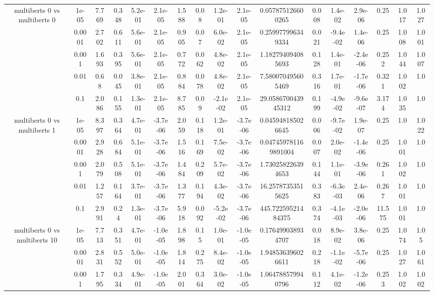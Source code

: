 \begin{tabular}{|c|c|c|c|c|c|c|c|c|c|c|c|c|c|c|c|c|}
\hline
\multirow{5}{*}{multiberts 0 vs multiberts 0} & 1e-05 & 7.769 & 0.348 & 5.2e-01 & 2.1e-05 & 1.588 & 0.08 & 1.2e-01 & 2.1e-05 & 0.057875126600265 & 0.008 & 1.4e-02 & 2.9e-06 & 0.25 & 1.017 & 1.027 \\
 & 0.0001 & 2.702 & 0.611 & 5.6e-01 & 2.1e-05 & 0.905 & 0.07 & 6.0e-02 & 2.1e-05 & 0.259977996349334 & 0.021 & -9.4e-02 & 1.4e-06 & 0.25 & 1.008 & 1.001 \\
 & 0.001 & 1.693 & 0.395 & 5.6e-01 & 2.1e-05 & 0.772 & 0.062 & 4.8e-02 & 2.1e-05 & 1.182794094085693 & 0.128 & 1.4e-01 & -2.4e-06 & 0.252 & 1.044 & 1.007 \\
 & 0.01 & 0.68 & 0.045 & 3.8e-01 & 2.1e-05 & 0.884 & 0.078 & 4.8e-02 & 2.1e-05 & 7.580070495605469 & 0.316 & 1.7e-01 & -1.7e-06 & 0.321 & 1.002 & 1.0 \\
 & 0.1 & 2.086 & 0.155 & 1.3e-01 & 2.1e-05 & 8.785 & 0.09 & -2.1e-02 & 2.1e-05 & 29.058670043945312 & 0.199 & -4.9e-02 & -9.6e-07 & 3.174 & 1.035 & 1.0 \\
\hline
\multirow{5}{*}{multiberts 0 vs multiberts 1} & 1e-05 & 8.397 & 0.364 & 4.7e-01 & -3.7e-06 & 2.059 & 0.118 & 1.2e-01 & -3.7e-06 & 0.045948185026645 & 0.006 & -9.7e-02 & 1.9e-07 & 0.25 & 1.0 & 1.022 \\
 & 0.0001 & 2.928 & 0.684 & 5.1e-01 & -3.7e-06 & 1.516 & 0.169 & 7.5e-02 & -3.7e-06 & 0.047459781169891004 & 0.007 & 2.0e-02 & -1.4e-06 & 0.25 & 1.001 & 1.0 \\
 & 0.001 & 2.079 & 0.508 & 5.1e-01 & -3.7e-06 & 1.484 & 0.209 & 5.7e-02 & -3.7e-06 & 1.730258226394653 & 0.144 & 1.1e-01 & -3.9e-06 & 0.261 & 1.002 & 1.0 \\
 & 0.01 & 1.257 & 0.164 & 3.7e-01 & -3.7e-06 & 1.377 & 0.194 & 4.3e-02 & -3.7e-06 & 16.25787353515625 & 0.383 & -6.3e-03 & 2.4e-06 & 0.267 & 1.001 & 1.0 \\
 & 0.1 & 2.991 & 0.24 & 1.3e-01 & -3.7e-06 & 5.918 & 0.092 & -5.2e-02 & -3.7e-06 & 445.72259521484375 & 0.374 & -4.1e-03 & -2.0e-06 & 11.575 & 1.001 & 1.0 \\
\hline
\multirow{5}{*}{multiberts 0 vs multiberts 10} & 1e-05 & 7.713 & 0.351 & 4.7e-01 & -1.0e-05 & 1.898 & 0.15 & 1.0e-01 & -1.0e-05 & 0.176499038934707 & 0.018 & 8.9e-02 & 3.8e-06 & 0.25 & 1.074 & 1.05 \\
 & 0.0001 & 2.831 & 0.552 & 5.0e-01 & -1.0e-05 & 1.814 & 0.275 & 8.4e-02 & -1.0e-05 & 1.948536396026611 & 0.218 & -1.1e-02 & -5.7e-06 & 0.25 & 1.027 & 1.061 \\
 & 0.001 & 1.795 & 0.334 & 4.9e-01 & -1.0e-05 & 2.001 & 0.364 & 3.0e-02 & -1.0e-05 & 1.064788579940796 & 0.112 & 4.1e-02 & -1.2e-06 & 0.253 & 1.002 & 1.002 \\

\end{tabular}
